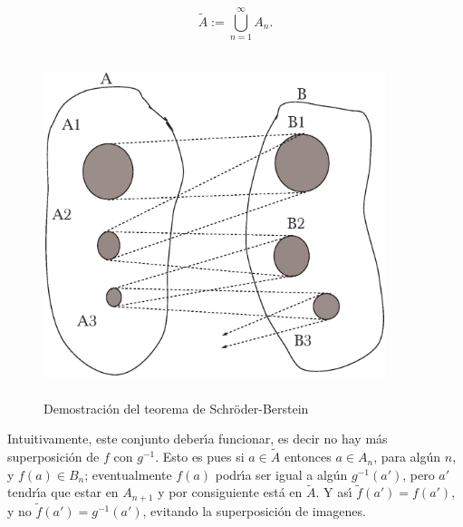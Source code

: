 \begin{equation}\label{defatilde}
\tilde{A}:=\bigcup_{n=1}^{\infty}A_n.
\end{equation}



\begin{figure}[h]

 \begin{center}




\includegraphics[height=10cm, width=10cm]{schber4.eps}

\end{center}

 \caption{Demostraci\'on del teorema de Schr\"oder-Berstein}\label{figura4}
\end{figure}

Intuitivamente, este conjunto deber\'{\i}a  funcionar, es decir no
hay m\'as superposici\'on de $f$ con $g^{-1}$. Esto es pues si
$a\in\tilde{A}$ entonces $a\in A_n$, para alg\'un $n$, y $f(a)\in
B_n$; eventualmente $f(a)$ podr\'{\i}a ser igual a alg\'un
$g^{-1}(a')$, pero $a'$ tendr\'{\i}a que estar en $A_{n+1}$ y por
consiguiente est\'a en $\tilde{A}$. Y as\'{\i}
$\tilde{f}(a')=f(a')$, y no $\tilde{f}(a')=g^{-1}(a')$, evitando
la superposici\'on de imagenes.

